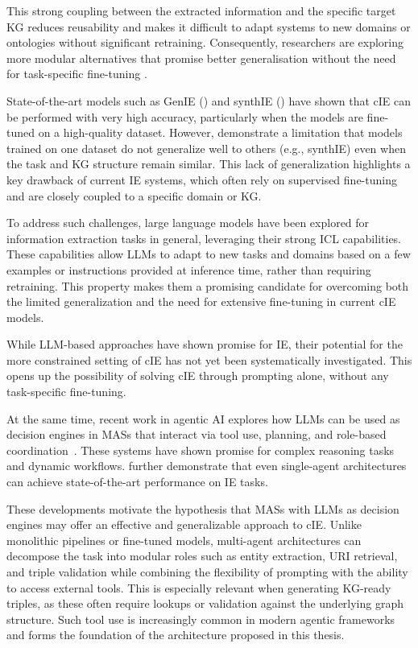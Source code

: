 \documentclass[a4paper,oneside,bibliography=totoc]{scrbook}
\begin{document}
This strong coupling between the extracted information and the specific target \ac{KG} reduces reusability and makes it difficult to adapt systems to new domains or ontologies without significant retraining. Consequently, researchers are exploring more modular alternatives that promise better generalisation without the need for task-specific fine-tuning \cite{Shi2024}.

State-of-the-art models such as GenIE (\cite{Josifoski2021}) and synthIE (\cite{Josifoski2023}) have shown that \ac{cIE} can be performed with very high accuracy, particularly when the models are fine-tuned on a high-quality dataset. However, \citet{Josifoski2021,Josifoski2023} demonstrate a limitation that models trained on one dataset do not generalize well to others (e.g., synthIE) even when the task and \ac{KG} structure remain similar. This lack of generalization highlights a key drawback of current \ac{IE} systems, which often rely on supervised fine-tuning and are closely coupled to a specific domain or \ac{KG}.

To address such challenges, large language models have been explored for information extraction tasks in general, leveraging their strong \ac{ICL} capabilities. These capabilities allow \acp{LLM} to adapt to new tasks and domains based on a few examples or instructions provided at inference time, rather than requiring retraining. This property makes them a promising candidate for overcoming both the limited generalization and the need for extensive fine-tuning in current \ac{cIE} models.

While LLM-based approaches have shown promise for \ac{IE}, their potential for the more constrained setting of \ac{cIE} has not yet been systematically investigated. This opens up the possibility of solving \ac{cIE} through prompting alone, without any task-specific fine-tuning.

At the same time, recent work in agentic AI explores how \acp{LLM} can be used as decision engines in \acp{MAS} that interact via tool use, planning, and role-based coordination~\cite{OpenAI2025,Anthropic2024,Wiesinger2025}. These systems have shown promise for complex reasoning tasks and dynamic workflows. \citet{Shi2024} further demonstrate that even single-agent architectures can achieve state-of-the-art performance on \ac{IE} tasks.

These developments motivate the hypothesis that \acp{MAS} with \acp{LLM} as decision engines may offer an effective and generalizable approach to \ac{cIE}. Unlike monolithic pipelines or fine-tuned models, multi-agent architectures can decompose the task into modular roles such as entity extraction, \ac{URI} retrieval, and triple validation while combining the flexibility of prompting with the ability to access external tools. This is especially relevant when generating \ac{KG}-ready triples, as these often require lookups or validation against the underlying graph structure. Such tool use is increasingly common in modern agentic frameworks \cite{OpenAI2025} and forms the foundation of the architecture proposed in this thesis.
\end{document}
